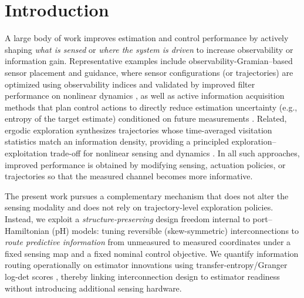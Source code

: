 \documentclass[final,5p,times,twocolumn]{elsarticle}
\begin{document}
	\section{Introduction}
	
	A large body of work improves estimation and control performance by actively shaping \emph{what is sensed} or \emph{where the system is driven} to increase observability or information gain. Representative examples include observability-Gramian--based sensor placement and guidance, where sensor configurations (or trajectories) are optimized using observability indices and validated by improved filter performance on nonlinear dynamics \citep{HinsonMorgansen2014_JGCD}, as well as active information acquisition methods that plan control actions to directly reduce estimation uncertainty (e.g., entropy of the target estimate) conditioned on future measurements \citep{AtanasovLeNyDaniilidisPappas2015_ICRA}. Related, ergodic exploration synthesizes trajectories whose time-averaged visitation statistics match an information density, providing a principled exploration--exploitation trade-off for nonlinear sensing and dynamics \citep{MillerSilvermanMacIverMurphey2016_TRO}. In all such approaches, improved performance is obtained by modifying sensing, actuation policies, or trajectories so that the measured channel becomes more informative.
	
	The present work pursues a complementary mechanism that does not alter the sensing modality and does not rely on trajectory-level exploration policies. Instead, we exploit a \emph{structure-preserving} design freedom internal to port--Hamiltonian (pH) models: tuning reversible (skew-symmetric) interconnections to \emph{route predictive information} from unmeasured to measured coordinates under a fixed sensing map and a fixed nominal control objective. We quantify information routing operationally on estimator innovations using transfer-entropy/Granger log-det scores \citep{Schreiber2000_PRL,Barnett2009_PRL}, thereby linking interconnection design to estimator readiness without introducing additional sensing hardware.
	
\end{document}
